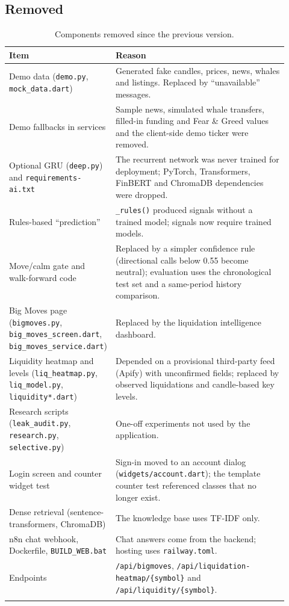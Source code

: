 \subsection{Removed}
{\renewcommand{\arraystretch}{1.3}
\begin{longtable}{|p{0.30\linewidth}|p{0.62\linewidth}|}
\hline\textbf{Item} & \textbf{Reason}\\\hline\endhead
Demo data (\texttt{demo.py}, \texttt{mock\_data.dart}) & Generated fake candles, prices, news, whales and listings. Replaced by ``unavailable'' messages.\\\hline
Demo fallbacks in services & Sample news, simulated whale transfers, filled-in funding and Fear \& Greed values and the client-side demo ticker were removed.\\\hline
Optional GRU (\texttt{deep.py}) and \texttt{requirements-ai.txt} & The recurrent network was never trained for deployment; PyTorch, Transformers, FinBERT and ChromaDB dependencies were dropped.\\\hline
Rules-based ``prediction'' & \texttt{\_rules()} produced signals without a trained model; signals now require trained models.\\\hline
Move/calm gate and walk-forward code & Replaced by a simpler confidence rule (directional calls below 0.55 become neutral); evaluation uses the chronological test set and a same-period history comparison.\\\hline
Big Moves page (\texttt{bigmoves.py}, \texttt{big\_moves\_screen.dart}, \texttt{big\_moves\_service.dart}) & Replaced by the liquidation intelligence dashboard.\\\hline
Liquidity heatmap and levels (\texttt{liq\_heatmap.py}, \texttt{liq\_model.py}, \texttt{liquidity*.dart}) & Depended on a provisional third-party feed (Apify) with unconfirmed fields; replaced by observed liquidations and candle-based key levels.\\\hline
Research scripts (\texttt{leak\_audit.py}, \texttt{research.py}, \texttt{selective.py}) & One-off experiments not used by the application.\\\hline
Login screen and counter widget test & Sign-in moved to an account dialog (\texttt{widgets/account.dart}); the template counter test referenced classes that no longer exist.\\\hline
Dense retrieval (sentence-transformers, ChromaDB) & The knowledge base uses TF-IDF only.\\\hline
n8n chat webhook, Dockerfile, \texttt{BUILD\_WEB.bat} & Chat answers come from the backend; hosting uses \texttt{railway.toml}.\\\hline
Endpoints & \texttt{/api/bigmoves}, \texttt{/api/liquidation-heatmap/\{symbol\}} and \texttt{/api/liquidity/\{symbol\}}.\\\hline
\caption{Components removed since the previous version.}\label{tab:removed}
\end{longtable}}

